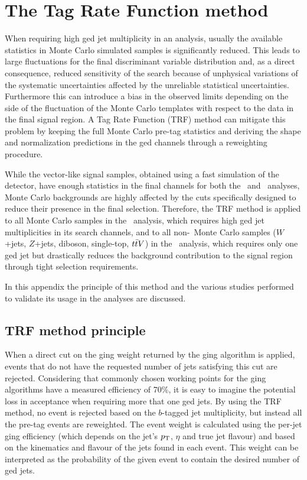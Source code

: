 \clearpage{\pagestyle{empty}\cleardoublepage}

\chapter{The Tag Rate Function method}\label{app:trf}

When requiring high \btag ged jet multiplicity in an analysis, 
usually the available statistics in Monte Carlo simulated  samples 
is significantly reduced. This leads to large fluctuations
for the final discriminant variable distribution
and, as a direct consequence, reduced sensitivity of
the search because of unphysical variations of 
the systematic uncertainties affected by the unreliable
statistical uncertainties.
Furthermore this can introduce a bias in the observed limits
depending on the side of the fluctuation of the Monte Carlo
templates with respect to the data in the final signal region.
A Tag Rate Function (TRF) method can mitigate this problem
by keeping the full Monte Carlo pre-tag statistics and deriving
the shape and normalization predictions in the \btag ged channels
through a reweighting procedure.

While the vector-like signal samples, obtained using a fast simulation
of the detector, have enough statistics in the final channels for
both the \wbx\ and \htx\ analyses, Monte Carlo backgrounds are highly
affected by the cuts specifically designed to reduce their presence
in the final selection.
Therefore, the TRF method is applied to all Monte Carlo samples in
the \htx\ analysis, which requires high \btag ged jet multiplicities
in its search channels, and to all non-\ttbar\ Monte Carlo samples
($W$+jets, $Z$+jets, diboson, single-top, $\ttbar V$) in the \wbx\ 
analysis, which requires only one \btag ged jet but drastically
reduces the background contribution to the signal region through
tight selection requirements.

In this appendix the principle of this method and the various 
studies performed to validate its usage in the analyses
are discussed.



\section{TRF method principle}

When a direct cut on the
\btag ging weight returned by the \btag ging algorithm
is applied, events that do not have the requested number
of jets satisfying this cut are rejected. Considering that
commonly chosen working points for the \btag ging algorithms
have a measured efficiency of 70\%, it is easy to imagine the
potential loss in acceptance when requiring more that one
\btag ged jets.
By using the TRF method, no event is rejected based on 
the $b$-tagged jet multiplicity, but instead all the pre-tag events 
are reweighted.
The event weight is calculated using the
per-jet  \btag ging efficiency
(which depends on the jet's $\pt$, $\eta$ and true jet flavour)
and based on the kinematics and flavour of the 
jets found in each event.
This weight can be interpreted as the probability of the 
given event to contain the desired number of \btag ged jets. 

